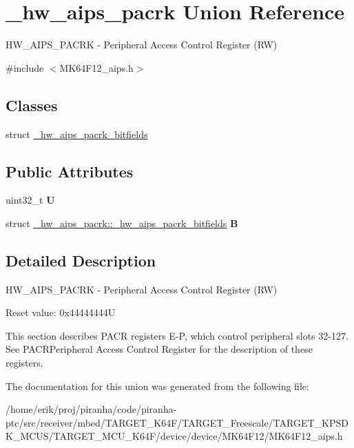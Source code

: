 \hypertarget{union__hw__aips__pacrk}{}\section{\+\_\+hw\+\_\+aips\+\_\+pacrk Union Reference}
\label{union__hw__aips__pacrk}


H\+W\+\_\+\+A\+I\+P\+S\+\_\+\+P\+A\+C\+RK -\/ Peripheral Access Control Register (RW)  




{\ttfamily \#include $<$M\+K64\+F12\+\_\+aips.\+h$>$}

\subsection*{Classes}
\begin{DoxyCompactItemize}
\item 
struct \hyperlink{struct__hw__aips__pacrk_1_1__hw__aips__pacrk__bitfields}{\+\_\+hw\+\_\+aips\+\_\+pacrk\+\_\+bitfields}
\end{DoxyCompactItemize}
\subsection*{Public Attributes}
\begin{DoxyCompactItemize}
\item 
uint32\+\_\+t {\bfseries U}\hypertarget{union__hw__aips__pacrk_ab789a7dd6cbf2464f8729847067daaf2}{}\label{union__hw__aips__pacrk_ab789a7dd6cbf2464f8729847067daaf2}

\item 
struct \hyperlink{struct__hw__aips__pacrk_1_1__hw__aips__pacrk__bitfields}{\+\_\+hw\+\_\+aips\+\_\+pacrk\+::\+\_\+hw\+\_\+aips\+\_\+pacrk\+\_\+bitfields} {\bfseries B}\hypertarget{union__hw__aips__pacrk_a6e7c299a10325dc45d517cb1eb057aca}{}\label{union__hw__aips__pacrk_a6e7c299a10325dc45d517cb1eb057aca}

\end{DoxyCompactItemize}


\subsection{Detailed Description}
H\+W\+\_\+\+A\+I\+P\+S\+\_\+\+P\+A\+C\+RK -\/ Peripheral Access Control Register (RW) 

Reset value\+: 0x44444444U

This section describes P\+A\+CR registers E-\/P, which control peripheral slots 32-\/127. See P\+A\+C\+R\+Peripheral Access Control Register for the description of these registers. 

The documentation for this union was generated from the following file\+:\begin{DoxyCompactItemize}
\item 
/home/erik/proj/piranha/code/piranha-\/ptc/src/receiver/mbed/\+T\+A\+R\+G\+E\+T\+\_\+\+K64\+F/\+T\+A\+R\+G\+E\+T\+\_\+\+Freescale/\+T\+A\+R\+G\+E\+T\+\_\+\+K\+P\+S\+D\+K\+\_\+\+M\+C\+U\+S/\+T\+A\+R\+G\+E\+T\+\_\+\+M\+C\+U\+\_\+\+K64\+F/device/device/\+M\+K64\+F12/M\+K64\+F12\+\_\+aips.\+h\end{DoxyCompactItemize}
